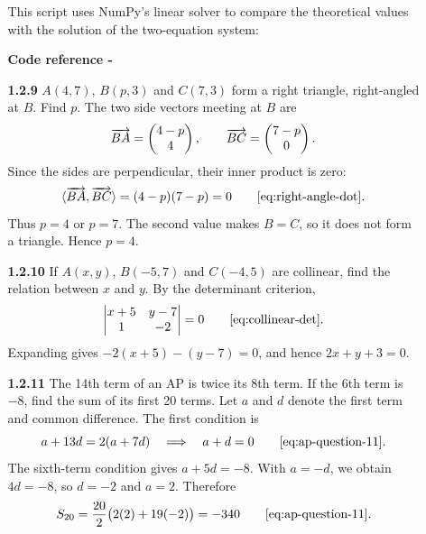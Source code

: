 \begin{enumerate}[label={},leftmargin=0pt]
\begin{enumerate}[label={},leftmargin=4mm,itemsep=9pt]
This script uses NumPy's linear solver to compare the theoretical values with the solution of the two-equation system:
\par\smallskip
\noindent\textbf{Code reference -}
\par\noindent{}
\par\smallskip
\setcounter{enumii}{9}
\setcounter{equation}{0}
\item[\textbf{1.2.9}] $A(4,7)$, $B(p,3)$ and $C(7,3)$ form a right triangle, right-angled at $B$. Find $p$.
\solution The two side vectors meeting at $B$ are
\begin{equation*}
\overrightarrow{BA}=\begin{pmatrix}4-p\\4\end{pmatrix},\qquad \overrightarrow{BC}=\begin{pmatrix}7-p\\0\end{pmatrix}.
\end{equation*}
Since the sides are perpendicular, their inner product is zero:
\begin{equation*}
\langle\overrightarrow{BA},\overrightarrow{BC}\rangle=(4-p)(7-p)=0\qquad\eqref{eq:right-angle-dot}.
\end{equation*}
Thus $p=4$ or $p=7$. The second value makes $B=C$, so it does not form a triangle. Hence $p=4$.




\setcounter{enumii}{10}
\setcounter{equation}{0}
\item[\textbf{1.2.10}] If $A(x,y)$, $B(-5,7)$ and $C(-4,5)$ are collinear, find the relation between $x$ and $y$.
\solution By the determinant criterion,
\begin{equation*}
\begin{vmatrix}x+5&y-7\\1&-2\end{vmatrix}=0\qquad\eqref{eq:collinear-det}.
\end{equation*}
Expanding gives $-2(x+5)-(y-7)=0$, and hence $2x+y+3=0$.



\newpage
\setcounter{enumii}{11}
\setcounter{equation}{0}
\item[\textbf{1.2.11}] The 14th term of an AP is twice its 8th term. If the 6th term is $-8$, find the sum of its first 20 terms.
\solution Let $a$ and $d$ denote the first term and common difference. The first condition is
\begin{equation*}
a+13d=2(a+7d)\quad\Longrightarrow\quad a+d=0\qquad\eqref{eq:ap-question-11}.
\end{equation*}
The sixth-term condition gives $a+5d=-8$. With $a=-d$, we obtain $4d=-8$, so $d=-2$ and $a=2$. Therefore
\begin{equation*}
S_{20}=\frac{20}{2}\bigl(2(2)+19(-2)\bigr)=-340\qquad\eqref{eq:ap-question-11}.
\end{equation*}




\end{enumerate}
\end{enumerate}
